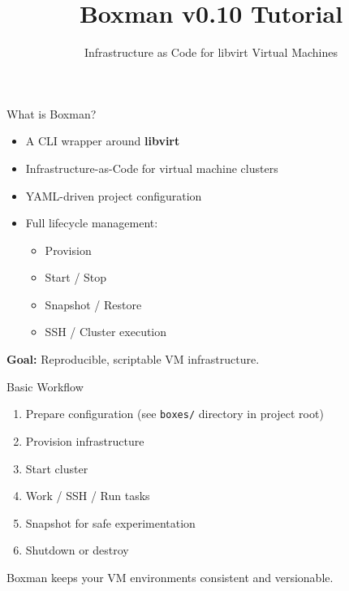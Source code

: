 \documentclass[aspectratio=169]{beamer}
\title{\textbf{Boxman v0.10 Tutorial}}
\subtitle{Infrastructure as Code for libvirt Virtual Machines}
\author{}
\date{}
\begin{document}
\begin{frame}
    \titlepage
\end{frame}

\begin{frame}{What is Boxman?}

\begin{itemize}
    \item A CLI wrapper around \textbf{libvirt}
    \item Infrastructure-as-Code for virtual machine clusters
    \item YAML-driven project configuration
    \item Full lifecycle management:
    \begin{itemize}
        \item Provision
        \item Start / Stop
        \item Snapshot / Restore
        \item SSH / Cluster execution
    \end{itemize}
\end{itemize}

\medskip
\textbf{Goal:} Reproducible, scriptable VM infrastructure.

\end{frame}

\begin{frame}{Basic Workflow}

\begin{enumerate}
    \item Prepare configuration (see \texttt{boxes/} directory in project root)
    \item Provision infrastructure
    \item Start cluster
    \item Work / SSH / Run tasks
    \item Snapshot for safe experimentation
    \item Shutdown or destroy
\end{enumerate}

\medskip
Boxman keeps your VM environments consistent and versionable.

\end{frame}

\end{document}
